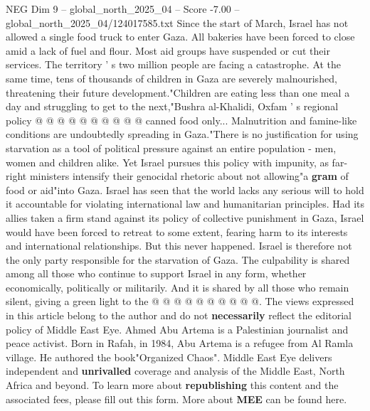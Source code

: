 \begin{textsample}{NEG Dim 9 – global\_north\_2025\_04 – Score -7.00 – global\_north\_2025\_04/124017585.txt}
Since the start of March, Israel has not allowed a single food truck to enter Gaza.
All bakeries have been forced to close amid a lack of fuel and flour.
Most aid groups have suspended or cut their services.
The territory ' s two million people are facing a catastrophe.
At the same time, tens of thousands of children in Gaza are severely malnourished, threatening their future development."Children are eating less than one meal a day and struggling to get to the next,"Bushra al-Khalidi, Oxfam ' s regional policy @ @ @ @ @ @ @ @ @ @ canned food only...
Malnutrition and famine-like conditions are undoubtedly spreading in Gaza."There is no justification for using starvation as a tool of political pressure against an entire population - men, women and children alike.
Yet Israel pursues this policy with impunity, as far-right ministers intensify their genocidal rhetoric about not allowing"a \textbf{gram} of food or aid"into Gaza.
Israel has seen that the world lacks any serious will to hold it accountable for violating international law and humanitarian principles.
Had its allies taken a firm stand against its policy of collective punishment in Gaza, Israel would have been forced to retreat to some extent, fearing harm to its interests and international relationships.
But this never happened.
Israel is therefore not the only party responsible for the starvation of Gaza.
The culpability is shared among all those who continue to support Israel in any form, whether economically, politically or militarily.
And it is shared by all those who remain silent, giving a green light to the @ @ @ @ @ @ @ @ @ @.
The views expressed in this article belong to the author and do not \textbf{necessarily} reflect the editorial policy of Middle East Eye.
Ahmed Abu Artema is a Palestinian journalist and peace activist.
Born in Rafah, in 1984, Abu Artema is a refugee from Al Ramla village.
He authored the book"Organized Chaos".
Middle East Eye delivers independent and \textbf{unrivalled} coverage and analysis of the Middle East, North Africa and beyond.
To learn more about \textbf{republishing} this content and the associated fees, please fill out this form.
More about \textbf{MEE} can be found here.

\end{textsample}
